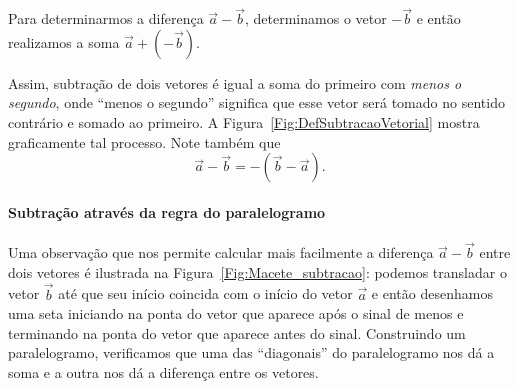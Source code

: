 \begin{marginfigure}[-1cm]
\centering
{}
\caption{Para determinarmos a diferença $\vec{a} - \vec{b}$, determinamos o vetor $-\vec{b}$ e então realizamos a soma $\vec{a} + (-\vec{b})$.\label{Fig:DefSubtracaoVetorial}}
\end{marginfigure}

Assim, subtração de dois vetores é igual a soma do primeiro com \emph{menos o segundo}, onde ``menos o segundo'' significa que esse vetor será tomado no sentido contrário e somado ao primeiro. A Figura~\ref{Fig:DefSubtracaoVetorial} mostra graficamente tal processo. Note também que
\begin{equation}
    \vec{a} - \vec{b} = -(\vec{b}-\vec{a}).
\end{equation}

\paragraph{Subtração através da regra do paralelogramo}

Uma observação que nos permite calcular mais facilmente a diferença $\vec{a} - \vec{b}$ entre dois vetores é ilustrada na Figura~\ref{Fig:Macete_subtracao}: podemos transladar o vetor $\vec{b}$ até que seu início coincida com o início do vetor $\vec{a}$ e então desenhamos uma seta iniciando na ponta do vetor que aparece após o sinal de menos e terminando na ponta do vetor que aparece antes do sinal. Construindo um paralelogramo, verificamos que uma das ``diagonais'' do paralelogramo nos dá a soma e a outra nos dá a diferença entre os vetores.

